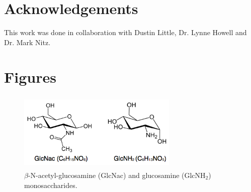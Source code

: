 
\section{Acknowledgements}
This work was done in collaboration with Dustin Little, Dr. Lynne Howell and Dr. Mark Nitz.

\section*{Figures}

\begin{figure}[htbp]
\centering
\includegraphics[height=1.5in, width=3in]{figures/results4/figure_pgab_sugars.png}
\caption[NAG]{$\beta$-N-acetyl-glucosamine (GlcNac) and glucosamine (GlcNH$_2$) monosaccharides.}
\label{fig:nag}
\end{figure}

